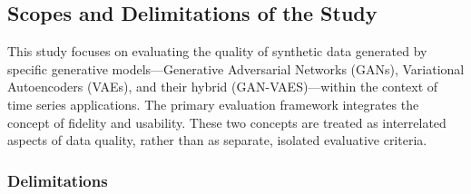 \documentclass{article}
\begin{document}
\subsection{Scopes and Delimitations of the Study}
This study focuses on evaluating the quality of synthetic data generated by specific generative models—Generative Adversarial Networks (GANs), Variational Autoencoders (VAEs), and their hybrid (GAN-VAES)—within the context of time series applications. The primary evaluation framework integrates the concept of fidelity and usability. These two concepts are treated as interrelated aspects of data quality, rather than as separate, isolated evaluative criteria.

\subsubsection{Delimitations}
\end{document}
